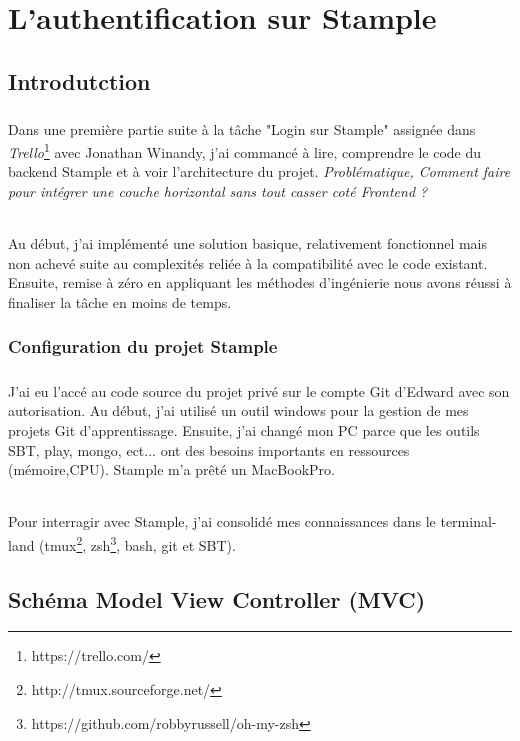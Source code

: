 \chapter{L'authentification sur Stample}
\section*{}
\section{Introdutction}
\paragraph{}
Dans une première partie suite à la tâche "Login sur Stample" assignée dans \textit{Trello}\footnote{https://trello.com/} avec Jonathan Winandy, j'ai commancé à lire, comprendre le code du backend Stample et à voir l'architecture du projet. 
\newline
\textit{Problématique, Comment faire pour intégrer une couche horizontal sans tout casser coté Frontend ?}
\subparagraph{}
Au début, j'ai implémenté une solution basique, relativement fonctionnel mais non achevé suite au complexités reliée à la compatibilité avec le code existant.
Ensuite, remise à zéro en appliquant les méthodes d'ingénierie nous avons réussi à finaliser la tâche en moins de temps.
\subsection{Configuration du projet Stample}
\paragraph{}
J'ai eu l'accé au code source du projet privé sur le compte Git d'Edward avec son autorisation.
Au début, j'ai utilisé un outil windows pour la gestion de mes projets Git d'apprentissage.
Ensuite, j'ai changé mon PC parce que les outils SBT, play, mongo, ect... ont des besoins importants en ressources (mémoire,CPU). Stample m'a prêté un MacBookPro. 
\subparagraph{}
Pour interragir avec Stample, j'ai consolidé mes connaissances dans le terminal-land (tmux\footnote{http://tmux.sourceforge.net/}, zsh\footnote{https://github.com/robbyrussell/oh-my-zsh}, bash, git et SBT).
\section{Schéma Model View Controller (MVC)}
